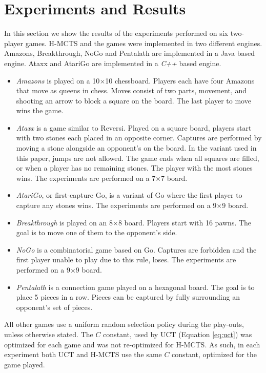 \documentclass[a4paper]{llncs}
\begin{document}
\section{Experiments and Results}
\label{sec:exp_res}
In this section we show the results of the experiments performed on six two-player games. H-MCTS and the games were implemented in two different engines. Amazons, Breakthrough, NoGo and Pentalath are implemented in a Java based engine. Ataxx and AtariGo are implemented in a \emph{C++} based engine.
\begin{itemize}
\item \emph{Amazons} is played on a 10$\times$10 chessboard. Players each have four Amazons that move as queens in chess. Moves consist of two parts, movement, and shooting an arrow to block a square on the board. The last player to move wins the game.
\item \emph{Ataxx} is a game similar to Reversi. Played on a square board, players start with two stones each placed in an opposite corner. Captures are performed by moving a stone alongside an opponent's on the board. In the variant used in this paper, jumps are not allowed. The game ends when all squares are filled, or when a player has no remaining stones. The player with the most stones wins.  The experiments are performed on a 7$\times$7 board.
\item \emph{AtariGo}, or first-capture Go, is a variant of Go where the first player to capture any stones wins. The experiments are performed on a 9$\times$9 board.
\item \emph{Breakthrough} is played on an 8$\times$8 board. Players start with 16 pawns. The goal is to move one of them to the opponent's side.
\item \emph{NoGo} is a combinatorial game based on Go. Captures are forbidden and the first player unable to play due to this rule, loses. The experiments are performed on a 9$\times$9 board.
\item \emph{Pentalath} is a connection game played on a hexagonal board. The goal is to place 5 pieces in a row. Pieces can be captured by fully surrounding an opponent's set of pieces.
\end{itemize}

All other games use a uniform random selection policy during the play-outs, unless otherwise stated. The $C$ constant, used by UCT (Equation \ref{eq:uct}) was optimized for each game and was not re-optimized for H-MCTS. As such, in each experiment both UCT and H-MCTS use the same $C$ constant, optimized for the game played.
\end{document}
